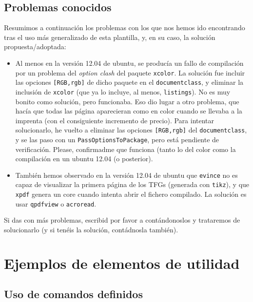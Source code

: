 \subsection{Problemas conocidos}
\label{sec:problemas-conocidos}

Resumimos a continuación los problemas con los que nos hemos ido
encontrando tras el uso más generalizado de esta plantilla, y, en su
caso, la solución propuesta/adoptada:

\begin{itemize}

\item Al menos en la versión 12.04 de ubuntu, se producía un fallo de
  compilación por un problema del \textit{option clash} del paquete
  \texttt{xcolor}. La solución fue incluir las opciones
  \texttt{[RGB,rgb]} de dicho paquete en el \texttt{documentclass}, y
  eliminar la inclusión de \texttt{xcolor} (que ya lo incluye, al menos,
  \texttt{listings}). No es muy bonito como solución, pero
  funcionaba. Eso dio lugar a otro problema, que hacía que todas las
  página aparecieran como en color cuando se llevaba a la imprenta (con
  el consiguiente incremento de precio). Para intentar solucionarlo, he
  vuelto a eliminar las opciones \texttt{[RGB,rgb]} del
  \texttt{documentclass}, y se las paso con un
  \texttt{PassOptionsToPackage}, pero está pendiente de
  verificación. Please, confirmadme que funciona (tanto lo del color
  como la compilación en un ubuntu 12.04 (o posterior).

\item También hemos observado en la versión 12.04 de ubuntu que
  \texttt{evince} no es capaz de visualizar la primera página de los
  TFGs (generada con \texttt{tikz}), y que \texttt{xpdf} genera un core
  cuando intenta abrir el fichero compilado. La solución es usar
  \texttt{qpdfview} o \texttt{acroread}. 

\end{itemize}

Si das con más problemas, escribid por favor a \contactauthor
contándonoslos y trataremos de solucionarlo (y si tenéis la solución,
contádnosla también).


\section{Ejemplos de elementos de utilidad}
\label{sec:ejempl-de-elem}

\subsection{Uso de comandos definidos}
\label{sec:uso-de-comandos}

